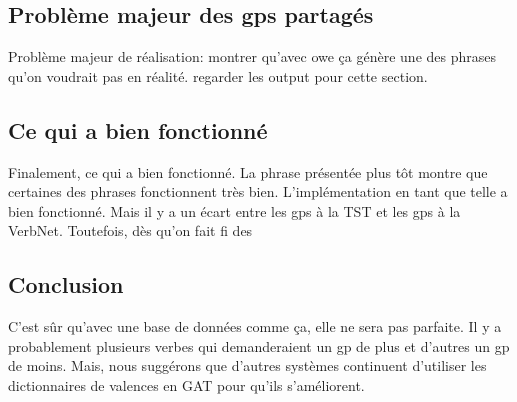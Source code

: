 \subsection{Problème majeur des gps partagés}
Problème majeur de réalisation: montrer qu'avec owe ça génère une des phrases qu'on voudrait pas en réalité.
regarder les output pour cette section.

\subsection{Ce qui a bien fonctionné}
Finalement, ce qui a bien fonctionné. La phrase présentée plus tôt montre que certaines des phrases fonctionnent très bien. L'implémentation en tant que telle a bien fonctionné. Mais il y a un écart entre les gps à la TST et les gps à la VerbNet. Toutefois, dès qu'on fait fi des

\subsection{Conclusion}
C'est sûr qu'avec une base de données comme ça, elle ne sera pas parfaite. Il y a probablement plusieurs verbes qui demanderaient un gp de plus et d'autres un gp de moins. Mais, nous suggérons que d'autres systèmes continuent d'utiliser les dictionnaires de valences en GAT pour qu'ils s'améliorent.

